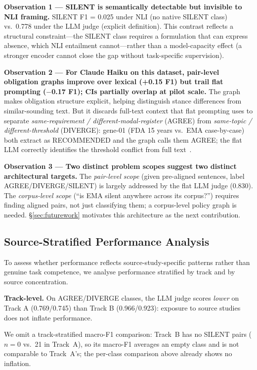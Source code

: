 \documentclass[manuscript]{acmart}
\begin{document}
\textbf{Observation 1 --- SILENT is semantically detectable but invisible to
NLI framing.} SILENT F1 = 0.025 under NLI (no native SILENT class) vs.\ 0.778
under the LLM judge (explicit definition). This contrast reflects a structural
constraint---the SILENT class requires a formulation that can express absence,
which NLI entailment cannot---rather than a model-capacity effect (a stronger
encoder cannot close the gap without task-specific supervision).

\textbf{Observation 2 --- For Claude Haiku on this dataset, pair-level
obligation graphs improve over lexical (+0.15 F1) but trail flat prompting
($-$0.17 F1); CIs partially overlap at pilot scale.} The graph makes
obligation structure explicit, helping distinguish stance differences from
similar-sounding text. But it discards full-text context that flat prompting
uses to separate \textit{same-requirement / different-modal-register} (AGREE)
from \textit{same-topic / different-threshold} (DIVERGE): gene-01 (FDA
15 years vs.\ EMA case-by-case) both extract as RECOMMENDED and the graph
calls them AGREE; the flat LLM correctly identifies the threshold conflict from
full text~\citep{yoran2024robust}.

\textbf{Observation 3 --- Two distinct problem scopes suggest two distinct
architectural targets.} The \textit{pair-level scope} (given pre-aligned
sentences, label AGREE/DIVERGE/SILENT) is largely addressed by the flat LLM
judge (0.830). The \textit{corpus-level scope} (``is EMA silent anywhere
across its corpus?'') requires finding aligned pairs, not just classifying
them; a corpus-level policy graph is needed. \S\ref{sec:futurework} motivates
this architecture as the next contribution.

\subsection{Source-Stratified Performance Analysis}
\label{sec:source_stratified}

To assess whether performance reflects source-study-specific patterns rather
than genuine task competence, we analyse performance stratified by track and
by source concentration.

\textbf{Track-level.} On AGREE/DIVERGE classes, the LLM judge scores
\textit{lower} on Track A (0.769/0.745) than Track B (0.966/0.923): exposure
to source studies does not inflate performance.

\noindent We omit a track-stratified macro-F1 comparison: Track~B has no SILENT
pairs ($n = 0$ vs.\ 21 in Track~A), so its macro-F1 averages an empty class and
is not comparable to Track~A's; the per-class comparison above already shows no
inflation.
\end{document}
